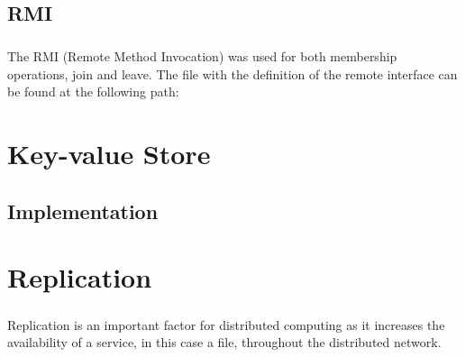 \documentclass{report}
\begin{document}
			\section{RMI}
				\paragraph{} The RMI (Remote Method Invocation) was used for both
				membership operations, join and leave. The file with the definition 
				of the remote interface can be found at the following path:

				\begin{center}
				\end{center}
				
	\chapter{Key-value Store}
	
	        \paragraph{}
	        
	        \paragraph{}

			\section{Implementation}
	
				\paragraph{}
				
				\paragraph{}
	
	\chapter{Replication}
	
	        \paragraph{} Replication is an important factor for distributed computing
			as it increases the availability of a service, in this case a file,
			throughout the distributed network.
	        
\end{document}
